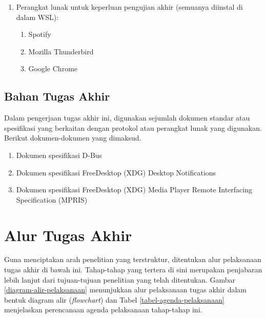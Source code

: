\begin{enumerate}
    \item Perangkat lunak untuk keperluan pengujian akhir (semuanya diinstal di dalam WSL):
    \begin{enumerate}
        \item Spotify
        \item Mozilla Thunderbird
        \item Google Chrome
    \end{enumerate}
\end{enumerate}

\subsection{Bahan Tugas Akhir}

Dalam pengerjaan tugas akhir ini, digunakan sejumlah dokumen standar atau spesifikasi yang berkaitan dengan protokol atau perangkat lunak yang digunakan. Berikut dokumen-dokumen yang dimaksud.
\begin{enumerate}
    \item Dokumen spesifikasi D-Bus \cite{dbus-specification}
    \item Dokumen spesifikasi FreeDesktop (XDG) Desktop Notifications \cite{xdg-desktop-notifications-specification}
    \item Dokumen spesifikasi FreeDesktop (XDG) Media Player Remote Interfacing Specification (MPRIS) \cite{xdg-mpris-specification}
\end{enumerate}


\section{Alur Tugas Akhir}

Guna menciptakan arah penelitian yang terstruktur, ditentukan alur pelaksanaan tugas akhir di bawah ini. Tahap-tahap yang tertera di sini merupakan penjabaran lebih lanjut dari tujuan-tujuan penelitian yang telah ditentukan. Gambar \ref{diagram-alir-pelaksanaan} menunjukkan alur pelaksanaan tugas akhir dalam bentuk diagram alir (\textit{flowchart}) dan Tabel \ref{tabel-agenda-pelaksanaan} menjelaskan perencanaan agenda pelaksanaan tahap-tahap ini.

